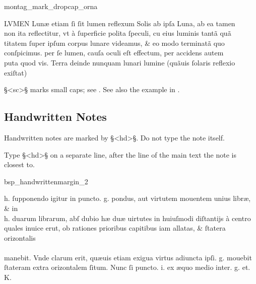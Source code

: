 \begin{sampleImage}{montag_mark_dropcap_orna}

\begin{typeLatin}
LVMEN Lunæ etiam ſi ſit lumen reflexum Solis ab ipſa Luna, ab ea tamen\\
non ita reflectitur, vt à ſuperficie polita ſpeculi, c\bs\tld{}u eius luminis tantã quã\\
titatem ſuper ipſum corpus lunare videamus, & eo modo terminatã quo\\
conſpicimus. per ſe lumen, cauſa oculi eſt effectum, per accidens autem\\
puta quod vis. Terra deinde nunquam lunari lumine (quãuis ſolaris reflexio exiſtat)\\
\someText {}
\end{typeLatin}
\end{sampleImage}

\vspace{-2mm}

\begin{crossref}
§<sc>§ marks small caps; see . See also the example in .
\end{crossref}


\tocspace
\subsection{Handwritten Notes}
\label{section handwritten notes}

\begin{mainrule}
Handwritten notes are marked by §<hd>§. Do not type the note itself.
\end{mainrule}

\begin{clarification}
Type §<hd>§ on a separate line, after the line of the main text the note is closest to.
\end{clarification}

\begin{sampleImage}{bsp_handwrittenmargin_2}

\begin{typeLatin}
 \someText
h. ſupponendo igitur in puncto. g. pondus, aut virtutem mouentem unius libræ, & in\\
h. duarum librarum, abſ dubio hæ duæ uirtutes in huiuſmodi diſtantijs à centro\\
quales inuic\bs\tld{}e er\bs\tld{}ut, ob rationes prioribus capitibus iam allatas, & ſtatera orizontalis\\
\\
manebit. Vnde clarum erit,  quæuis etiam exigua virtus adiuncta ipſi. g. mouebit\\
ſtateram extra orizontalem ſitum. Nunc ſi puncto. i. ex æquo medio inter. g. et. K.
\someText {}
\end{typeLatin}
\end{sampleImage}

